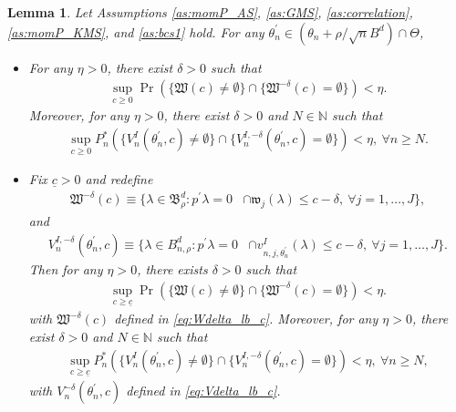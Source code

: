 \documentclass[letterpaper,11pt]{article}
\theoremstyle{myplain}
\newtheorem{lemma}{Lemma}[section]
\theoremstyle{mydefinition}
\theoremstyle{myremark}
\newcommand{\thetnprime}{(\theta_n +\rho /\sqrt{n} B^d)\cap \Theta}
\numberwithin{equation}{section}
\numberwithin{figure}{section}
\begin{document}
\begin{appendices}
\begin{lemma}\label{lem:empt}
Let Assumptions \ref{as:momP_AS}, \ref{as:GMS}, \ref{as:correlation}, \ref{as:momP_KMS}, and \ref{as:bcs1} hold.  
	 For any $\theta_n^\prime \in \thetnprime$,
	\begin{itemize}
	\item[(i)]
For any $\eta>0$, there exist $\delta>0$   such that
	\begin{align}
		\sup_{c \ge 0}\Pr(\{\mathfrak W(c)\ne\emptyset\}\cap \{\mathfrak W^{-\delta}(c)=\emptyset\})<\eta.\label{eq:emptiness1}
		\end{align}
Moreover, for any $\eta>0$, there exist $\delta>0$ and $N\in\mathbb N$  such that
	\begin{align}
		\sup_{c \ge 0}P_n^*(\{V^I_n(\theta_n^\prime,c)\ne\emptyset\}\cap \{V_n^{I,-\delta}(\theta_n^\prime,c)=\emptyset\})<\eta,~\forall n\ge N.\label{eq:emptiness1_boot}
		\end{align}
	\item[(ii)] Fix $\underline{c}>0$ and redefine
	\begin{align}
\mathfrak W^{-\delta}(c)
\equiv \big\{ \lambda\in \mathfrak B^d_\rho: p^\prime \lambda =0 &\cap \mathfrak w_j(\lambda)\le c-\delta , \: \forall j=1,\dots,J\big\}, \label{eq:Wdelta_lb_c}
	\end{align}
and
	\begin{align}
V_n^{I,-\delta}(\theta_n^\prime,c)
\equiv \big\{ \lambda\in B^d_{n,\rho}: p^\prime \lambda =0 &\cap v^I_{n,j,\theta_n^\prime}(\lambda)\le c-\delta, \: \forall j=1,\dots,J\big\}. \label{eq:Vdelta_lb_c}
	\end{align}
	Then for any $\eta>0$, there exists $\delta>0$   such that
	\begin{align}
		\sup_{c \ge \underline{c}}\Pr(\{\mathfrak W(c)\ne\emptyset\}\cap \{\mathfrak W^{-\delta}(c)=\emptyset\})<\eta.\label{eq:emptiness1_lb_c}
		\end{align}
		with $\mathfrak W^{-\delta}(c)$ defined in \eqref{eq:Wdelta_lb_c}.
Moreover, for any $\eta>0$, there exist $\delta>0$ and $N\in\mathbb N$  such that
	\begin{align}
		\sup_{c \ge \underline{c}}P_n^*(\{V^I_n(\theta_n^\prime,c)\ne\emptyset\}\cap \{V_n^{I,-\delta}(\theta_n^\prime,c)=\emptyset\})<\eta,~\forall n\ge N,\label{eq:emptiness1_boot_lb_c}
		\end{align}
		with $V_n^{-\delta }(\theta_n^\prime,c)$ defined in \eqref{eq:Vdelta_lb_c}.
\end{itemize}	 
\end{lemma}


\end{appendices}
\end{document}
